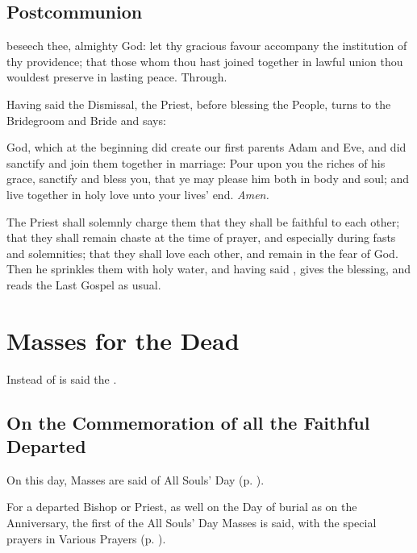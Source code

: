 \subsection{Postcommunion}
 beseech thee, almighty God: let thy gracious favour accompany the institution of thy providence; that those whom thou hast joined together in lawful union thou wouldest preserve in lasting peace. Through.

\clearpage
\begin{rubric}
    Having said the Dismissal, the Priest, before blessing the People, turns to the Bridegroom and Bride and says:
\end{rubric}
 God, which at the beginning did create our first parents Adam and Eve, and did sanctify and join them together in marriage: Pour upon you the riches of his grace, sanctify and {} bless you, that ye may please him both in body and soul; and live together in holy love unto your lives' end. \textit{Amen.}
\begin{rubric}
    The Priest shall solemnly charge them that they shall be faithful to each other; that they shall remain chaste at the time of prayer, and especially during fasts and solemnities; that they shall love each other, and remain in the fear of God. Then he sprinkles them with holy water, and having said , gives the blessing, and reads the Last Gospel as usual.
\end{rubric}

\clearpage
\section{Masses for the Dead}\label{RequiemMasses}
\fancyhead[RE,LO]{}
\begin{secrubric}
    Instead of  is said the .
\end{secrubric}
\vspace{-2ex}
\subsection{On the Commemoration of all the Faithful Departed}
\begin{rubric}
    On this day, Masses are said of All Souls' Day (p. \pageref{AllSouls}).
\end{rubric}
\begin{rubric}
    For a departed Bishop or Priest, as well on the Day of burial as on the Anniversary, the first of the All Souls' Day Masses is said, with the special prayers in Various Prayers (p. \pageref{RequiemPrayers}).
\end{rubric}
